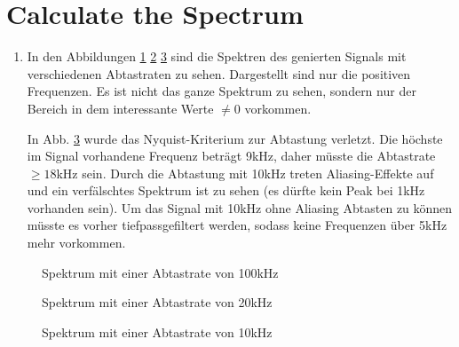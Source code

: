 \documentclass[conference]{IEEEtran}
\begin{document}
\section{Calculate the Spectrum}
\begin{enumerate}

\item In den Abbildungen \ref{fig:fft1} \ref{fig:fft2} \ref{fig:fft3} sind die Spektren des genierten Signals mit verschiedenen Abtastraten zu sehen. Dargestellt sind nur die positiven Frequenzen. Es ist nicht das ganze Spektrum zu sehen, sondern nur der Bereich in dem interessante Werte $\neq 0$ vorkommen.

In Abb. \ref{fig:fft3} wurde das Nyquist-Kriterium zur Abtastung verletzt. Die höchste im Signal vorhandene Frequenz beträgt 9kHz, daher müsste die Abtastrate $\ge 18$kHz sein. Durch die Abtastung mit 10kHz treten Aliasing-Effekte auf und ein verfälschtes Spektrum ist zu sehen (es dürfte kein Peak bei 1kHz vorhanden sein). Um das Signal mit 10kHz ohne Aliasing Abtasten zu können müsste es vorher tiefpassgefiltert werden, sodass keine Frequenzen über 5kHz mehr vorkommen. 
\end{enumerate}
\begin{figure}[h!]
  	\centering
    \scalebox{.5}{}
    \caption{Spektrum mit einer Abtastrate von 100kHz}
    \label{fig:fft1}
\end{figure}
\begin{figure}[h!]
  	\centering
    \scalebox{.5}{}
    \caption{Spektrum mit einer Abtastrate von 20kHz}
    \label{fig:fft2}
\end{figure}
\begin{figure}[h!]
  	\centering
    \scalebox{.5}{}
    \caption{Spektrum mit einer Abtastrate von 10kHz}
    \label{fig:fft3}
\end{figure}
\end{document}
